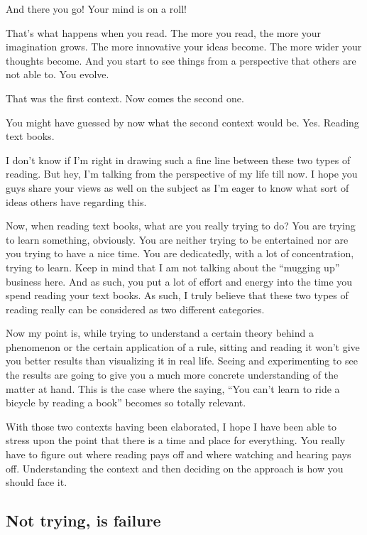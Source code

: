 \documentclass[twoside,11pt,titlepage]{article}
\begin{document}
And there you go! Your mind is on a roll!

That's what happens when you read. The more you read, the more your imagination grows. The more innovative your ideas become. The more wider your thoughts become. And you start to see things from a perspective that others are not able to. You evolve.

That was the first context. Now comes the second one.

You might have guessed by now what the second context would be. Yes. Reading text books.

I don't know if I'm right in drawing such a fine line between these two types of reading. But hey, I'm talking from the perspective of my life till now. I hope you guys share your views as well on the subject as I'm eager to know what sort of ideas others have regarding this.

Now, when reading text books, what are you really trying to do? You are trying to learn something, obviously. You are neither trying to be entertained nor are you trying to have a nice time. You are dedicatedly, with a lot of concentration, trying to learn. Keep in mind that I am not talking about the ``mugging up'' business here. And as such, you put a lot of effort and energy into the time you spend reading your text books. As such, I truly believe that these two types of reading really can be considered as two different categories.

Now my point is, while trying to understand a certain theory behind a phenomenon or the certain application of a rule, sitting and reading it won't give you better results than visualizing it in real life. Seeing and experimenting to see the results are going to give you a much more concrete understanding of the matter at hand. This is the case where the saying, ``You can't learn to ride a bicycle by reading a book'' becomes so totally relevant.

With those two contexts having been elaborated, I hope I have been able to stress upon the point that there is a time and place for everything. You really have to figure out where reading pays off and where watching and hearing pays off. Understanding the context and then deciding on the approach is how you should face it.

\newpage
\begin{center}
  \section{Not trying, is failure}
\end{center}
\bigskip
\bigskip
\bigskip
\end{document}
